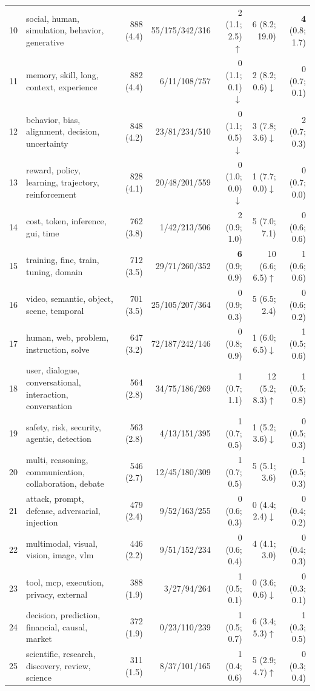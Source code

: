 \begin{widetable}
{\begin{tabular}{rlrrrrr}
10 & social, human, simulation, behavior, generative & 888 (4.4) & 55/175/342/316 & 2 (1.1; 2.5)$\uparrow$ & 6 (8.2; 19.0) & \textbf{4} (0.8; 1.7) \\
11 & memory, skill, long, context, experience & 882 (4.4) & 6/11/108/757 & 0 (1.1; 0.1)$\downarrow$ & 2 (8.2; 0.6)$\downarrow$ & 0 (0.7; 0.1) \\
12 & behavior, bias, alignment, decision, uncertainty & 848 (4.2) & 23/81/234/510 & 0 (1.1; 0.5)$\downarrow$ & 3 (7.8; 3.6)$\downarrow$ & 2 (0.7; 0.3) \\
13 & reward, policy, learning, trajectory, reinforcement & 828 (4.1) & 20/48/201/559 & 0 (1.0; 0.0)$\downarrow$ & 1 (7.7; 0.0)$\downarrow$ & 0 (0.7; 0.0) \\
14 & cost, token, inference, gui, time & 762 (3.8) & 1/42/213/506 & 2 (0.9; 1.0) & 5 (7.0; 7.1) & 0 (0.6; 0.6) \\
15 & training, fine, train, tuning, domain & 712 (3.5) & 29/71/260/352 & \textbf{6} (0.9; 0.9) & 10 (6.6; 6.5)$\uparrow$ & 1 (0.6; 0.6) \\
16 & video, semantic, object, scene, temporal & 701 (3.5) & 25/105/207/364 & 0 (0.9; 0.3) & 5 (6.5; 2.4) & 0 (0.6; 0.2) \\
17 & human, web, problem, instruction, solve & 647 (3.2) & 72/187/242/146 & 0 (0.8; 0.9) & 1 (6.0; 6.5)$\downarrow$ & 1 (0.5; 0.6) \\
\midrule
18 & user, dialogue, conversational, interaction, conversation & 564 (2.8) & 34/75/186/269 & 1 (0.7; 1.1) & 12 (5.2; 8.3)$\uparrow$ & 1 (0.5; 0.8) \\
19 & safety, risk, security, agentic, detection & 563 (2.8) & 4/13/151/395 & 1 (0.7; 0.5) & 1 (5.2; 3.6)$\downarrow$ & 0 (0.5; 0.3) \\
20 & multi, reasoning, communication, collaboration, debate & 546 (2.7) & 12/45/180/309 & 1 (0.7; 0.5) & 5 (5.1; 3.6) & 1 (0.5; 0.3) \\
21 & attack, prompt, defense, adversarial, injection & 479 (2.4) & 9/52/163/255 & 0 (0.6; 0.3) & 0 (4.4; 2.4)$\downarrow$ & 0 (0.4; 0.2) \\
22 & multimodal, visual, vision, image, vlm & 446 (2.2) & 9/51/152/234 & 0 (0.6; 0.4) & 4 (4.1; 3.0) & 0 (0.4; 0.3) \\
23 & tool, mcp, execution, privacy, external & 388 (1.9) & 3/27/94/264 & 1 (0.5; 0.1) & 0 (3.6; 0.6)$\downarrow$ & 0 (0.3; 0.1) \\
24 & decision, prediction, financial, causal, market & 372 (1.9) & 0/23/110/239 & 1 (0.5; 0.7) & 6 (3.4; 5.3)$\uparrow$ & 1 (0.3; 0.5) \\
25 & scientific, research, discovery, review, science & 311 (1.5) & 8/37/101/165 & 1 (0.4; 0.6) & 5 (2.9; 4.7)$\uparrow$ & 0 (0.3; 0.4) \\
\bottomrule
\end{tabular}}
\end{widetable}
